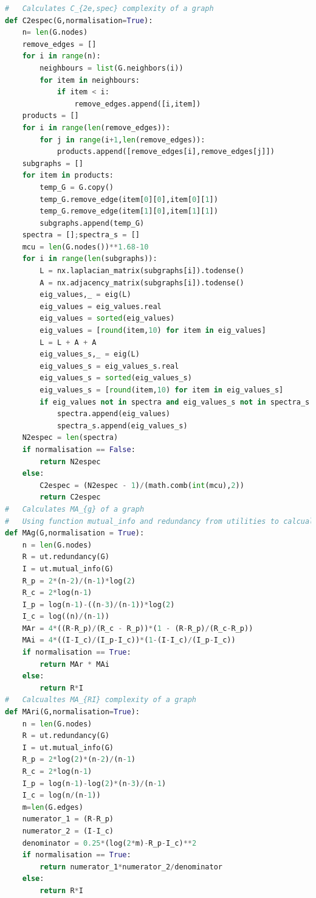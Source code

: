 \documentclass[12pt]{article}
\begin{document}
\begin{lstlisting}[language=Python,breaklines=true]
#   Calculates C_{2e,spec} complexity of a graph
def C2espec(G,normalisation=True):
    n= len(G.nodes)
    remove_edges = []
    for i in range(n):
        neighbours = list(G.neighbors(i))
        for item in neighbours:
            if item < i:
                remove_edges.append([i,item])
    products = []
    for i in range(len(remove_edges)):
        for j in range(i+1,len(remove_edges)):
            products.append([remove_edges[i],remove_edges[j]])
    subgraphs = []
    for item in products:
        temp_G = G.copy()
        temp_G.remove_edge(item[0][0],item[0][1])
        temp_G.remove_edge(item[1][0],item[1][1])
        subgraphs.append(temp_G)
    spectra = [];spectra_s = []
    mcu = len(G.nodes())**1.68-10
    for i in range(len(subgraphs)):
        L = nx.laplacian_matrix(subgraphs[i]).todense()
        A = nx.adjacency_matrix(subgraphs[i]).todense()
        eig_values,_ = eig(L)
        eig_values = eig_values.real
        eig_values = sorted(eig_values)
        eig_values = [round(item,10) for item in eig_values]
        L = L + A + A
        eig_values_s,_ = eig(L)
        eig_values_s = eig_values_s.real
        eig_values_s = sorted(eig_values_s)
        eig_values_s = [round(item,10) for item in eig_values_s]
        if eig_values not in spectra and eig_values_s not in spectra_s:
            spectra.append(eig_values)
            spectra_s.append(eig_values_s)
    N2espec = len(spectra)
    if normalisation == False:
        return N2espec
    else:
        C2espec = (N2espec - 1)/(math.comb(int(mcu),2))
        return C2espec
#   Calculates MA_{g} of a graph
#   Using function mutual_info and redundancy from utilities to calcualte I and R
def MAg(G,normalisation = True):
    n = len(G.nodes)
    R = ut.redundancy(G)
    I = ut.mutual_info(G)
    R_p = 2*(n-2)/(n-1)*log(2)
    R_c = 2*log(n-1)
    I_p = log(n-1)-((n-3)/(n-1))*log(2)
    I_c = log((n)/(n-1))
    MAr = 4*((R-R_p)/(R_c - R_p))*(1 - (R-R_p)/(R_c-R_p))
    MAi = 4*((I-I_c)/(I_p-I_c))*(1-(I-I_c)/(I_p-I_c))
    if normalisation == True:
        return MAr * MAi
    else:
        return R*I
#   Calcualtes MA_{RI} complexity of a graph
def MAri(G,normalisation=True):
    n = len(G.nodes)
    R = ut.redundancy(G)
    I = ut.mutual_info(G)
    R_p = 2*log(2)*(n-2)/(n-1)
    R_c = 2*log(n-1)
    I_p = log(n-1)-log(2)*(n-3)/(n-1)
    I_c = log(n/(n-1))
    m=len(G.edges)
    numerator_1 = (R-R_p)
    numerator_2 = (I-I_c)
    denominator = 0.25*(log(2*m)-R_p-I_c)**2
    if normalisation == True:
        return numerator_1*numerator_2/denominator
    else:
        return R*I
\end{lstlisting}
\end{document}
